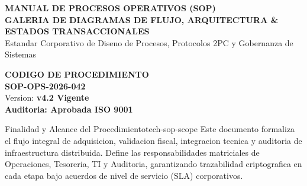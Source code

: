 \documentclass[11pt,a4paper]{article}
\begin{document}

\drawchromaticbar[3.5pt]
\vspace{2.5mm}

\noindent
\begin{minipage}[t]{0.65\textwidth}
  {\fontsize{16}{20}\selectfont\bfseries\color{corpPrimary}MANUAL DE PROCESOS OPERATIVOS (SOP)}\\[2pt]
  {\small\bfseries\color{corpTextAccent}GALERIA DE DIAGRAMAS DE FLUJO, ARQUITECTURA \& ESTADOS TRANSACCIONALES}\\[3pt]
  {\footnotesize\color{corpTextMuted}Estandar Corporativo de Diseno de Procesos, Protocolos 2PC y Gobernanza de Sistemas}
\end{minipage}\hfill
\begin{minipage}[t]{0.32\textwidth}
  \raggedleft
  \begin{tcolorbox}[
    enhanced,
    colback=corpLightBg,
    colframe=corpBorder,
    arc=2mm,
    boxrule=0.7pt,
    top=2mm, bottom=2mm, left=3mm, right=3mm
  ]
    \raggedleft
    {\scriptsize\bfseries\color{corpTextMuted}CODIGO DE PROCEDIMIENTO}\\[1pt]
    {\normalsize\bfseries\color{corpPrimary}SOP-OPS-2026-042}\\[2pt]
    {\scriptsize\color{corpTextDark}Version: \textbf{v4.2 Vigente}}\\[1pt]
    {\scriptsize\color{corpSuccess}\textbf{Auditoria: Aprobada ISO 9001}}
  \end{tcolorbox}
\end{minipage}

\vspace{2mm}

\begin{corptech}{Finalidad y Alcance del Procedimiento}{tech-sop-scope}
  Este documento formaliza el flujo integral de adquisicion, validacion fiscal, integracion tecnica y auditoria de infraestructura distribuida. Define las responsabilidades matriciales de Operaciones, Tesoreria, TI y Auditoria, garantizando trazabilidad criptografica en cada etapa bajo acuerdos de nivel de servicio (SLA) corporativos.
\end{corptech}

\vspace{1.5mm}
\vspace{1mm}
\end{document}

